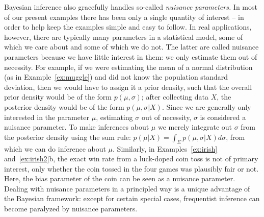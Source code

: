 Bayesian inference also gracefully handles so-called \textit{nuisance parameters.} In most of our present examples there has been only a single quantity of interest -- in order to help keep the examples simple and easy to follow. In real applications, however, there are typically many parameters in a statistical model, some of which we care about and some of which we do not. The latter are called nuisance parameters because we have little interest in them: we only estimate them out of necessity. For example, if we were estimating the mean of a normal distribution (as in Example~\ref{ex:muggle}) and did not know the population standard deviation, then we would have to assign it a prior density, such that the overall prior density would be of the form $p(\mu,\sigma)$; after collecting data $X$, the posterior density would be of the form $p(\mu,\sigma|X)$. Since we are generally only interested in the parameter $\mu$, estimating $\sigma$ out of necessity, $\sigma$ is considered a nuisance parameter. To make inferences about $\mu$ we merely integrate out $\sigma$ from the posterior density using the sum rule: $p(\mu|X)= \int_{\Sigma}p(\mu,\sigma|X)d\sigma$, from which we can do inference about $\mu$. Similarly, in Examples~\ref{ex:irish} and~\ref{ex:irish2}b, the exact win rate from a luck-doped coin toss is not of primary interest, only whether the coin tossed in the four games was plausibly fair or not. Here, the bias parameter of the coin can be seen as a nuisance parameter. Dealing with nuisance parameters in a principled way is a unique advantage of the Bayesian framework: except for certain special cases, frequentist inference can become paralyzed by nuisance parameters.


